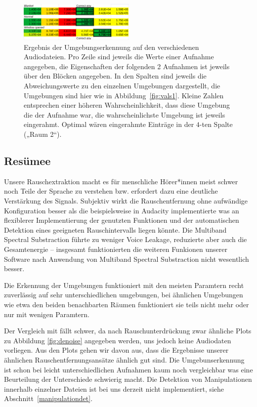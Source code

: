 \documentclass[
	fontsize=10.5pt,
	marginpar=false,
	ngerman,
	accentcolor=3d
	]{tudapub}
\begin{document}
\begin{figure}[h]
	\centering
	\includegraphics[width=0.5\textwidth]{media/vals1}
	\caption{Ergebnis der Umgebungserkennung auf den verschiedenen Audiodateien. Pro Zeile sind jeweils die Werte einer Aufnahme angegeben, die Eigenschaften der folgenden 2 Aufnahmen ist jeweils über den Blöcken angegeben. In den Spalten sind jeweils die Abweichungswerte zu den einzelnen Umgebungen dargestellt, die Umgebungen sind hier wie in Abbildung~\ref{fig:vals1}. Kleine Zahlen entsprechen einer höheren Wahrscheinlichkeit, dass diese Umgebung die der Aufnahme war, die wahrscheinlichste Umgebung ist jeweils eingerahmt. Optimal wären eingerahmte Einträge in der $4$-ten Spalte („Raum 2“).}
	\label{fig:vals2}
\end{figure}


\subsection{Resümee}

Unsere Rauschextraktion macht es für menschliche Hörer*innen meist schwer noch Teile der Sprache zu verstehen bzw. erfordert dazu eine deutliche Verstärkung des Signals. Subjektiv wirkt die Rauschentfernung ohne aufwändige Konfiguration besser als die beispielsweise in Audacity \cite{audacity_audacity_nodate} implementierte was an flexiblerer Implementierung der genutzten Funktionen und der automatischen Detektion eines geeigneten Rauschintervalls liegen könnte. Die Multiband Spectral Substraction führte zu weniger Voice Leakage, reduzierte aber auch die Gesamtenergie – insgesamt funktionierten die weiteren Funkionen unserer Software nach Anwendung von Multiband Spectral Substraction nicht wesentlich besser.

Die Erkennung der Umgebungen funktioniert mit den meisten Paramtern recht zuverlässig auf sehr unterschiedlichen umgebungen, bei ähnlichen Umgebungen wie etwa den beiden benachbarten Räumen funktioniert sie teils nicht mehr oder nur mit wenigen Paramtern.

Der Vergleich mit \cite{ikram_digital_2010} fällt schwer, da nach Rauschunterdrückung zwar ähnliche Plots zu Abbildung \ref{fig:denoise} angegeben werden, uns jedoch keine Audiodaten vorliegen. Aus den Plots gehen wir davon aus, dass die Ergebnisse unserer ähnlichen Rauschentfernungsansätze ähnlich gut sind. Die Umgebunserkennung ist schon bei leicht unterschiedlichen Aufnahmen kaum noch vergleichbar was eine Beurteilung der Unterschiede schwierig macht. Die Detektion von Manipulationen innerhalb einzelner Dateien ist bei uns derzeit nicht implementiert, siehe Abschnitt~\ref{manipulationdet}.
\end{document}
